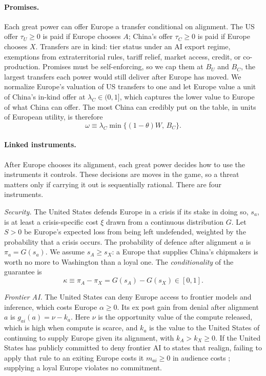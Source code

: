 \paragraph{Promises.} Each great power can offer Europe a transfer conditional on alignment. The US offer $\tau_U \geq 0$ is paid if Europe chooses $A$; China's offer $\tau_C \geq 0$ is paid if Europe chooses $X$. Transfers are in kind: tier status under an AI export regime, exemptions from extraterritorial rules, tariff relief, market access, credit, or co-production. Promises must be self-enforcing, so we cap them at $B_U$ and $B_C$, the largest transfers each power would still deliver after Europe has moved. We normalize Europe's valuation of US transfers to one and let Europe value a unit of China's in-kind offer at $\lambda_C \in (0,1]$, which captures the lower value to Europe of what China can offer. The most China can credibly put on the table, in units of European utility, is therefore
\begin{equation}\label{eq:omega}
\omega \equiv \lambda_C \min\{(1-\theta)W,\, B_C\}.
\end{equation}

\paragraph{Linked instruments.} After Europe chooses its alignment, each great power decides how to use the instruments it controls. These decisions are moves in the game, so a threat matters only if carrying it out is sequentially rational. There are four instruments.

\emph{Security.} The United States defends Europe in a crisis if its stake in doing so, $s_a$, is at least a crisis-specific cost $\xi$ drawn from a continuous distribution $G$. Let $S>0$ be Europe's expected loss from being left undefended, weighted by the probability that a crisis occurs. The probability of defence after alignment $a$ is $\pi_a = G(s_a)$. We assume $s_A \geq s_X$: a Europe that supplies China's chipmakers is worth no more to Washington than a loyal one. The \emph{conditionality} of the guarantee is
\begin{equation}\label{eq:kappa}
\kappa \equiv \pi_A - \pi_X = G(s_A) - G(s_X) \in [0,1].
\end{equation}

\emph{Frontier AI.} The United States can deny Europe access to frontier models and inference, which costs Europe $\alpha \geq 0$. Its ex post gain from denial after alignment $a$ is $g_{ai}(a) = \nu - k_a$. Here $\nu$ is the opportunity value of the compute released, which is high when compute is scarce, and $k_a$ is the value to the United States of continuing to supply Europe given its alignment, with $k_A > k_X \geq 0$. If the United States has publicly committed to deny frontier AI to states that realign, failing to apply that rule to an exiting Europe costs it $m_{ai} \geq 0$ in audience costs \citep{fearon1994domestic}; supplying a loyal Europe violates no commitment.

